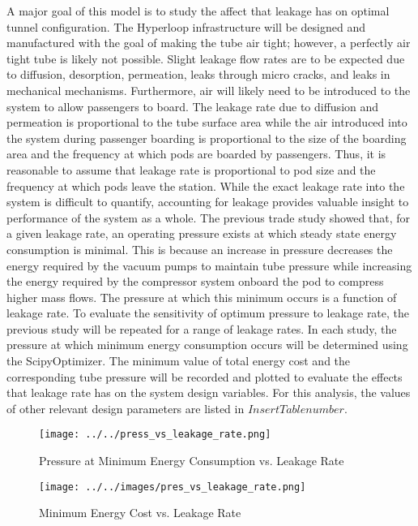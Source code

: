 A major goal of this model is to study the affect that leakage has on optimal tunnel configuration. The Hyperloop infrastructure will be designed and manufactured with the goal of making the tube air tight; however, a perfectly air tight tube is likely not possible. Slight leakage flow rates are to be expected due to diffusion, desorption, permeation, leaks through micro cracks, and leaks in mechanical mechanisms. Furthermore, air will likely need to be introduced to the system to allow passengers to board. The leakage rate due to diffusion and permeation is proportional to the tube surface area while the air introduced into the system during passenger boarding is proportional to the size of the boarding area and the frequency at which pods are boarded by passengers. Thus, it is reasonable to assume that leakage rate is proportional to pod size and the frequency at which pods leave the station. While the exact leakage rate into the system is difficult to quantify, accounting for leakage provides valuable insight to performance of the system as a whole. 
The previous trade study showed that, for a given leakage rate, an operating pressure exists at which steady state energy consumption is minimal. This is because an increase in pressure decreases the energy required by the vacuum pumps to maintain tube pressure while increasing the energy required by the compressor system onboard the pod to compress higher mass flows. The pressure at which this minimum occurs is a function of leakage rate. To evaluate the sensitivity of optimum pressure to leakage rate, the previous study will be repeated for a range of leakage rates. In each study, the pressure at which minimum energy consumption occurs will be determined using the ScipyOptimizer. The minimum value of total energy cost and the corresponding tube pressure will be recorded and plotted to evaluate the effects that leakage rate has on the system design variables. For this analysis, the values of other relevant design parameters are listed in $Insert Table number$.
\begin{figure}
	\centering
	\texttt{[image: ../../press\_vs\_leakage\_rate.png]}
	\caption{Pressure at Minimum Energy Consumption vs. Leakage Rate}
	\label{fig:pres_vs_leakage_rate}
\end{figure}
\begin{figure}
	\centering
	\texttt{[image: ../../images/pres\_vs\_leakage\_rate.png]}
	\caption{Minimum Energy Cost vs. Leakage Rate}
	\label{fig:pres_vs_leakage_rate}
\end{figure}
